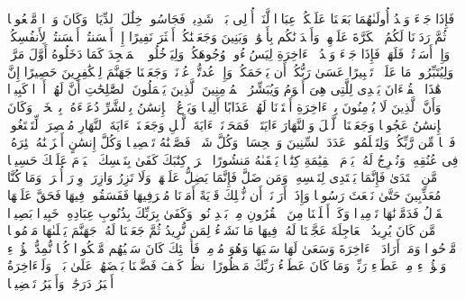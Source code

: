 \stopbuffer%
\startbuffer[\q:17:5]
فَإِذَا جَاۤءَ وَعۡدُ أُولَىٰهُمَا بَعَثۡنَا عَلَیۡكُمۡ عِبَادࣰا لَّنَاۤ أُو۟لِی بَأۡسࣲ شَدِیدࣲ فَجَاسُوا۟ خِلَٰلَ ٱلدِّیَارِۚ وَكَانَ وَعۡدࣰا مَّفۡعُولࣰا%
\stopbuffer%
\startbuffer[\q:17:6]
ثُمَّ رَدَدۡنَا لَكُمُ ٱلۡكَرَّةَ عَلَیۡهِمۡ وَأَمۡدَدۡنَٰكُم بِأَمۡوَٰلࣲ وَبَنِینَ وَجَعَلۡنَٰكُمۡ أَكۡثَرَ نَفِیرًا%
\stopbuffer%
\startbuffer[\q:17:7]
إِنۡ أَحۡسَنتُمۡ أَحۡسَنتُمۡ لِأَنفُسِكُمۡۖ وَإِنۡ أَسَأۡتُمۡ فَلَهَاۚ فَإِذَا جَاۤءَ وَعۡدُ ٱلۡءَاخِرَةِ لِیَسُۥۤءُوا۟ وُجُوهَكُمۡ وَلِیَدۡخُلُوا۟ ٱلۡمَسۡجِدَ كَمَا دَخَلُوهُ أَوَّلَ مَرَّةࣲ وَلِیُتَبِّرُوا۟ مَا عَلَوۡا۟ تَتۡبِیرًا%
\stopbuffer%
\startbuffer[\q:17:8]
عَسَىٰ رَبُّكُمۡ أَن یَرۡحَمَكُمۡۚ وَإِنۡ عُدتُّمۡ عُدۡنَاۚ وَجَعَلۡنَا جَهَنَّمَ لِلۡكَٰفِرِینَ حَصِیرًا%
\stopbuffer%
\startbuffer[\q:17:9]
إِنَّ هَٰذَا ٱلۡقُرۡءَانَ یَهۡدِی لِلَّتِی هِیَ أَقۡوَمُ وَیُبَشِّرُ ٱلۡمُؤۡمِنِینَ ٱلَّذِینَ یَعۡمَلُونَ ٱلصَّٰلِحَٰتِ أَنَّ لَهُمۡ أَجۡرࣰا كَبِیرࣰا%
\stopbuffer%
\startbuffer[\q:17:10]
وَأَنَّ ٱلَّذِینَ لَا یُؤۡمِنُونَ بِٱلۡءَاخِرَةِ أَعۡتَدۡنَا لَهُمۡ عَذَابًا أَلِیمࣰا%
\stopbuffer%
\startbuffer[\q:17:11]
وَیَدۡعُ ٱلۡإِنسَٰنُ بِٱلشَّرِّ دُعَاۤءَهُۥ بِٱلۡخَیۡرِۖ وَكَانَ ٱلۡإِنسَٰنُ عَجُولࣰا%
\stopbuffer%
\startbuffer[\q:17:12]
وَجَعَلۡنَا ٱلَّیۡلَ وَٱلنَّهَارَ ءَایَتَیۡنِۖ فَمَحَوۡنَاۤ ءَایَةَ ٱلَّیۡلِ وَجَعَلۡنَاۤ ءَایَةَ ٱلنَّهَارِ مُبۡصِرَةࣰ لِّتَبۡتَغُوا۟ فَضۡلࣰا مِّن رَّبِّكُمۡ وَلِتَعۡلَمُوا۟ عَدَدَ ٱلسِّنِینَ وَٱلۡحِسَابَۚ وَكُلَّ شَیۡءࣲ فَصَّلۡنَٰهُ تَفۡصِیلࣰا%
\stopbuffer%
\startbuffer[\q:17:13]
وَكُلَّ إِنسَٰنٍ أَلۡزَمۡنَٰهُ طَٰۤئِرَهُۥ فِی عُنُقِهِۦۖ وَنُخۡرِجُ لَهُۥ یَوۡمَ ٱلۡقِیَٰمَةِ كِتَٰبࣰا یَلۡقَىٰهُ مَنشُورًا%
\stopbuffer%
\startbuffer[\q:17:14]
ٱقۡرَأۡ كِتَٰبَكَ كَفَىٰ بِنَفۡسِكَ ٱلۡیَوۡمَ عَلَیۡكَ حَسِیبࣰا%
\stopbuffer%
\startbuffer[\q:17:15]
مَّنِ ٱهۡتَدَىٰ فَإِنَّمَا یَهۡتَدِی لِنَفۡسِهِۦۖ وَمَن ضَلَّ فَإِنَّمَا یَضِلُّ عَلَیۡهَاۚ وَلَا تَزِرُ وَازِرَةࣱ وِزۡرَ أُخۡرَىٰۗ وَمَا كُنَّا مُعَذِّبِینَ حَتَّىٰ نَبۡعَثَ رَسُولࣰا%
\stopbuffer%
\startbuffer[\q:17:16]
وَإِذَاۤ أَرَدۡنَاۤ أَن نُّهۡلِكَ قَرۡیَةً أَمَرۡنَا مُتۡرَفِیهَا فَفَسَقُوا۟ فِیهَا فَحَقَّ عَلَیۡهَا ٱلۡقَوۡلُ فَدَمَّرۡنَٰهَا تَدۡمِیرࣰا%
\stopbuffer%
\startbuffer[\q:17:17]
وَكَمۡ أَهۡلَكۡنَا مِنَ ٱلۡقُرُونِ مِنۢ بَعۡدِ نُوحࣲۗ وَكَفَىٰ بِرَبِّكَ بِذُنُوبِ عِبَادِهِۦ خَبِیرَۢا بَصِیرࣰا%
\stopbuffer%
\startbuffer[\q:17:18]
مَّن كَانَ یُرِیدُ ٱلۡعَاجِلَةَ عَجَّلۡنَا لَهُۥ فِیهَا مَا نَشَاۤءُ لِمَن نُّرِیدُ ثُمَّ جَعَلۡنَا لَهُۥ جَهَنَّمَ یَصۡلَىٰهَا مَذۡمُومࣰا مَّدۡحُورࣰا%
\stopbuffer%
\startbuffer[\q:17:19]
وَمَنۡ أَرَادَ ٱلۡءَاخِرَةَ وَسَعَىٰ لَهَا سَعۡیَهَا وَهُوَ مُؤۡمِنࣱ فَأُو۟لَٰۤئِكَ كَانَ سَعۡیُهُم مَّشۡكُورࣰا%
\stopbuffer%
\startbuffer[\q:17:20]
كُلࣰّا نُّمِدُّ هَٰۤؤُلَاۤءِ وَهَٰۤؤُلَاۤءِ مِنۡ عَطَاۤءِ رَبِّكَۚ وَمَا كَانَ عَطَاۤءُ رَبِّكَ مَحۡظُورًا%
\stopbuffer%
\startbuffer[\q:17:21]
ٱنظُرۡ كَیۡفَ فَضَّلۡنَا بَعۡضَهُمۡ عَلَىٰ بَعۡضࣲۚ وَلَلۡءَاخِرَةُ أَكۡبَرُ دَرَجَٰتࣲ وَأَكۡبَرُ تَفۡضِیلࣰا%
\stopbuffer%

